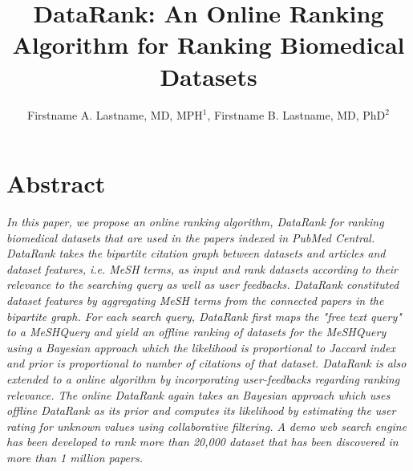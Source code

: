 \documentclass{amia}
\begin{document}
\title{DataRank: An Online Ranking Algorithm for Ranking Biomedical Datasets}

\author{Firstname A. Lastname, MD, MPH$^1$, Firstname B. Lastname, MD, PhD$^2$ }



\maketitle

\section*{Abstract}

\textit{In this paper, we propose an online ranking algorithm, DataRank for ranking biomedical datasets that are used in the papers indexed in PubMed Central. DataRank takes the bipartite citation graph between datasets and articles and dataset features, i.e. MeSH terms, as input and rank datasets according to their relevance to the searching query as well as user feedbacks. DataRank constituted dataset features by aggregating MeSH terms from the connected papers in the bipartite graph. For each search query, DataRank first maps the "free text query" to a MeSHQuery and yield an \emph{offline} ranking of datasets for the MeSHQuery using a Bayesian approach which the likelihood is proportional to Jaccard index and prior is proportional to number of citations of that dataset. DataRank is also extended to a \emph{online} algorithm by incorporating user-feedbacks regarding ranking relevance. The online DataRank again takes an Bayesian approach  which uses offline DataRank as its prior and computes its likelihood by estimating the user rating for unknown values using collaborative filtering. A demo web search engine has been developed to rank more than 20,000 dataset that has been discovered in more than 1 million papers.}
\end{document}
